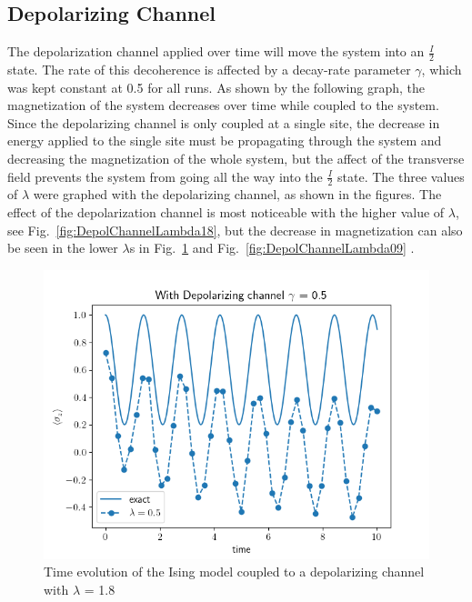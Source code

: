 \documentclass[12pt, twocolumn]{article}
\begin{document}
  \subsection{Depolarizing Channel}
  The depolarization channel applied over time will move the system into an $\frac{I}{2}$ state. The rate of this decoherence is affected by a decay-rate parameter $\gamma$, which was kept constant at 0.5 for all runs. As shown by the following graph, the magnetization of the system decreases over time while coupled to the system. Since the depolarizing channel is only coupled at a single site, the decrease in energy applied to the single site must be propagating through the system and decreasing the magnetization of the whole system, but the affect of the transverse field prevents the system from going all the way into the $\frac{I}{2}$ state. The three values of $\lambda$ were graphed with the depolarizing channel, as shown in the figures. The effect of the depolarization channel is most noticeable with the higher value of $\lambda$, see Fig.~\ref{fig:DepolChannelLambda18},  but the decrease in magnetization can also be seen in the lower $\lambda$s in Fig.~\ref{fig:DepolChannelLambda05} and Fig.~\ref{fig:DepolChannelLambda09} .

  \begin{figure}[!htb]
    \centering
    \includegraphics[width=\columnwidth]{images/DepolChannelLambda05.png}
    \caption{Time evolution of the Ising model coupled to a depolarizing channel with $\lambda$ = 1.8%
      \label{fig:DepolChannelLambda05}}
  \end{figure}
\end{document}
